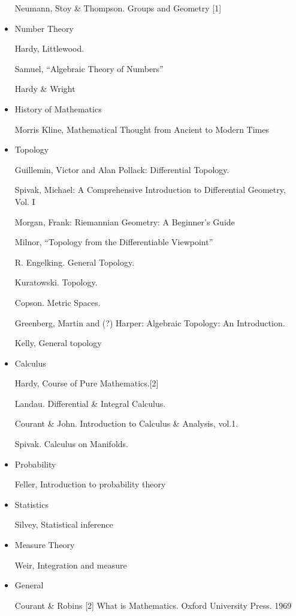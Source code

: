 \begin{itemize}
  Neumann, Stoy \& Thompson. Groups and Geometry [1]

  \item Number Theory

  Hardy, Littlewood.

  Samuel, ``Algebraic Theory of Numbers''

  Hardy \& Wright

  \item History of Mathematics

  Morris Kline, Mathematical Thought from Ancient to Modern Times

  \item Topology

  Guillemin, Victor and Alan Pollack: Differential Topology.

  Spivak, Michael: A Comprehensive Introduction to Differential
  Geometry, Vol. I

  Morgan, Frank: Riemannian Geometry: A Beginner's Guide

  Milnor, ``Topology from the Differentiable Viewpoint''

  R. Engelking. General Topology.

  Kuratowski. Topology.

  Copson. Metric Spaces.

  Greenberg, Martin and (?) Harper: Algebraic Topology: An Introduction.

  Kelly, General topology

  \item Calculus

  Hardy, Course of Pure Mathematics.[2]

  Landau. Differential \& Integral Calculus.

  Courant \& John. Introduction to Calculus \& Analysis, vol.1.

  Spivak. Calculus on Manifolds.

  \item Probability

  Feller, Introduction to probability theory

  \item Statistics

  Silvey, Statistical inference

  \item Measure Theory

  Weir, Integration and measure

  \item General

  Courant \& Robins [2] What is Mathematics.  Oxford University Press.
  1969
\end{itemize}
